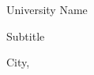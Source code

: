\makeatletter 
\begin{titlepage}
	\begin{center}
		\vspace*{1cm}
		\Large		
		University Name
		\vspace*{1cm}
		
		\Huge
		\textbf{\@title}
		
		
		\vspace{0.5cm}
		\LARGE
		Subtitle
		
		\vspace{1.5cm}
		
		\textbf{\@author}		
		\vfill		
		\titledescription	
		\vspace{0.8cm}
		
		\Large
		City, \@date
		
	\end{center}
\end{titlepage}
 \makeatother
